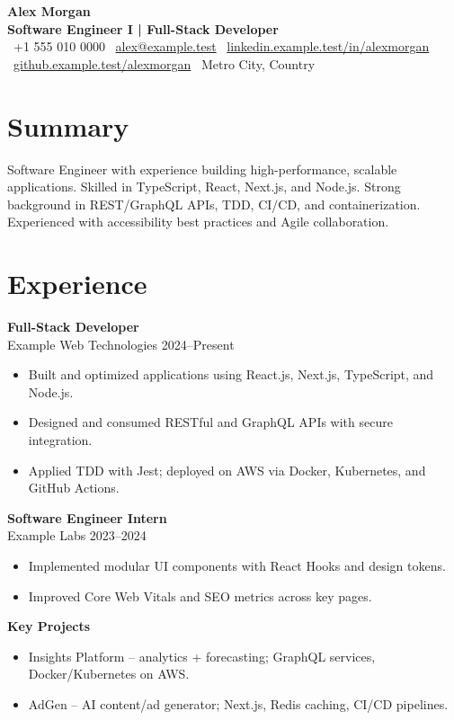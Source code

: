\documentclass[a4paper,11pt]{article}
\begin{document}
\begin{center}
    {\Huge \textbf{Alex Morgan}}\\[1pt]
    {\color{gray}\textbf{Software Engineer I | Full-Stack Developer}}\\[6pt]
    \small
    \textbullet\ +1 555 010 0000 \textbullet\ \href{mailto:alex@example.test}{alex@example.test} \textbullet\ \href{https://linkedin.example.test/in/alexmorgan}{linkedin.example.test/in/alexmorgan} \textbullet\ \href{https://github.example.test/alexmorgan}{github.example.test/alexmorgan} \textbullet\ Metro City, Country
\end{center}
\section*{Summary}
Software Engineer with experience building high-performance, scalable applications. Skilled in TypeScript, React, Next.js, and Node.js. Strong background in REST/GraphQL APIs, TDD, CI/CD, and containerization. Experienced with accessibility best practices and Agile collaboration.
\section*{Experience}
\textbf{Full-Stack Developer} \\
Example Web Technologies \hfill 2024–Present
\begin{itemize}
    \item Built and optimized applications using React.js, Next.js, TypeScript, and Node.js.
    \item Designed and consumed RESTful and GraphQL APIs with secure integration.
    \item Applied TDD with Jest; deployed on AWS via Docker, Kubernetes, and GitHub Actions.
\end{itemize}
\textbf{Software Engineer Intern} \\
Example Labs \hfill 2023–2024
\begin{itemize}
    \item Implemented modular UI components with React Hooks and design tokens.
    \item Improved Core Web Vitals and SEO metrics across key pages.
\end{itemize}

\textbf{Key Projects}
\begin{itemize}
    \item Insights Platform – analytics + forecasting; GraphQL services, Docker/Kubernetes on AWS.
    \item AdGen – AI content/ad generator; Next.js, Redis caching, CI/CD pipelines.
\end{itemize}
\end{document}
